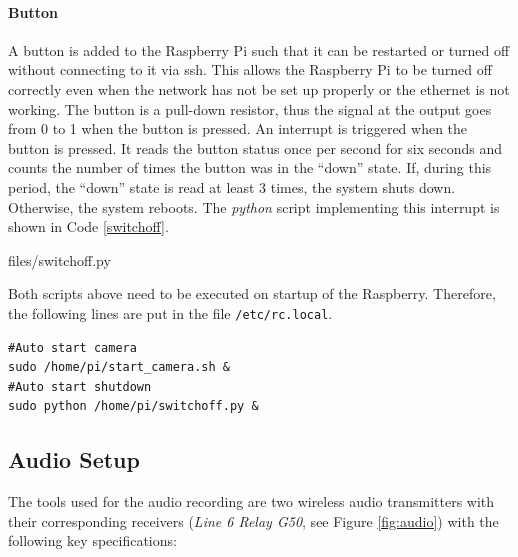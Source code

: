 \paragraph{Button}

A button is added to the Raspberry Pi such that it can be restarted or turned off without connecting to it via ssh. This allows the Raspberry Pi to be turned off correctly even when the network has not be set up properly or the ethernet is not working.
The button is a pull-down resistor, thus the signal at the output goes from 0 to 1 when the button is pressed. 
An interrupt is triggered when the button is pressed. 
It reads the button status once per second for six seconds and counts the number of times the button was in the ``down'' state. 
If, during this period, the ``down'' state is read at least 3 times, the system shuts down. Otherwise, the system reboots. 
The \textit{python} script implementing this interrupt is shown in Code \ref{switchoff}.

\begin{center}
\begin{minipage}{0.9\linewidth}
    \begin{lstinputlisting}[caption=\texttt{$\sim$\/switchoff.py}, label=switchoff, language=Python, frame=none]{files/switchoff.py}
\end{lstinputlisting}
\end{minipage}
\end{center}


Both scripts above need to be executed on startup of the Raspberry. Therefore, the following lines are put in the file \texttt{/etc/rc.local}.
\begin{center}
\begin{minipage}{0.9\linewidth}
    \begin{lstlisting}[caption=\texttt{/etc/rc.local}, label=local, frame=none]
#Auto start camera
sudo /home/pi/start_camera.sh &
#Auto start shutdown
sudo python /home/pi/switchoff.py &
\end{lstlisting}
\end{minipage}
\end{center}

 \subsection{Audio Setup}
  The tools used for the audio recording are two wireless audio transmitters with their corresponding 
  receivers (\textit{Line 6 Relay G50}, see Figure \ref{fig:audio}) 
  with the following key specifications:


